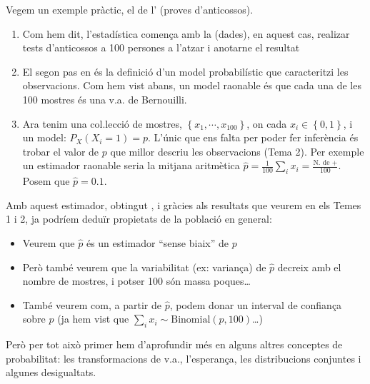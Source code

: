 \documentclass[letterpaper,10pt,english]{sphinxmanual}
\begin{document}
Vegem un exemple pràctic, el de l’ (proves d’anticossos).
\begin{enumerate}
%
\item {} 
Com hem dit, l’estadística comença amb la  (dades), en aquest cas, realizar tests d’anticossos a 100 persones a l’atzar i anotar\sphinxhyphen{}ne el resultat

\item {} 
El segon pas en  és la definició d’un model probabilístic que caracteritzi les observacions. Com hem vist abans, un model raonable és que cada una de les 100 mostres és una v.a. de Bernouilli.

\item {} 
Ara tenim una col.lecció de mostres, \(\left\{x_1, \cdots, x_{100}\right\}\), on cada \(x_i\in \left\{0, 1\right\}\), i un model: \(P_X\left(X_i=1\right) = p\). L’únic que ens falta per poder fer inferència és trobar el valor de \(p\) que millor descriu les observacions (Tema 2). Per exemple un estimador raonable seria la mitjana aritmètica \(\hat{p}=\frac{1}{100}\sum_i x_i= \frac{\mbox{N. de +}}{100}\). Posem que \(\hat{p}=0.1\).

\end{enumerate}

Amb aquest estimador, obtingut , i gràcies als resultats que
veurem en els Temes 1 i 2, ja podríem deduïr propietats de la població en general:
\begin{itemize}
\item {} 
Veurem que \(\hat{p}\) és un estimador “sense biaix” de \(p\)

\item {} 
Però també veurem que la variabilitat (ex: variança) de \(\hat{p}\) decreix amb el nombre de mostres, i potser 100 són massa poques…

\item {} 
També veurem com, a partir de \(\hat{p}\), podem donar un interval de confiança sobre \(p\) (ja hem vist que \(\sum_i x_i \sim \mbox{Binomial}\left(p, 100 \right)\)…)

\end{itemize}

Però per tot això primer hem d’aprofundir més en alguns altres conceptes de probabilitat: les transformacions
de v.a., l’esperança, les distribucions conjuntes i algunes desigualtats.
\end{document}
